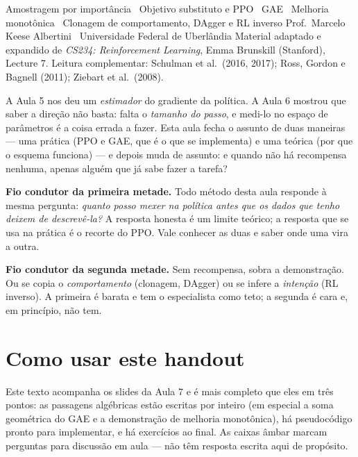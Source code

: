 \documentclass[11pt]{article}
\begin{document}
     {Amostragem por importância \textbullet\ Objetivo substituto e PPO \textbullet\ GAE \textbullet\
      Melhoria monotônica \textbullet\ Clonagem de comportamento, DAgger e RL inverso}
     {Prof.\ Marcelo Keese Albertini \textbullet\ Universidade Federal de Uberlândia}
     {Material adaptado e expandido de \textit{CS234: Reinforcement Learning}, Emma Brunskill
      (Stanford), Lecture 7. Leitura complementar: Schulman et al.\ (2016, 2017);
      Ross, Gordon e Bagnell (2011); Ziebart et al.\ (2008).}

\noindent
A Aula 5 nos deu um \emph{estimador} do gradiente da política. A Aula 6 mostrou que
saber a direção não basta: falta o \emph{tamanho do passo}, e medi-lo no espaço de
parâmetros é a coisa errada a fazer. Esta aula fecha o assunto de duas maneiras --- uma
prática (PPO e GAE, que é o que se implementa) e uma teórica (por que o esquema funciona)
--- e depois muda de assunto: e quando não há recompensa nenhuma, apenas alguém que já
sabe fazer a tarefa?

\begin{ideiabox}
  \textbf{Fio condutor da primeira metade.} Todo método desta aula responde à mesma
  pergunta: \emph{quanto posso mexer na política antes que os dados que tenho deixem de
  descrevê-la?} A resposta honesta é um limite teórico; a resposta que se usa na prática
  é o recorte do PPO. Vale conhecer as duas e saber onde uma vira a outra.

  \smallskip
  \textbf{Fio condutor da segunda metade.} Sem recompensa, sobra a demonstração. Ou se
  copia o \emph{comportamento} (clonagem, DAgger) ou se infere a \emph{intenção}
  (RL inverso). A primeira é barata e tem o especialista como teto; a segunda é cara e,
  em princípio, não tem.
\end{ideiabox}

\section*{Como usar este handout}

Este texto acompanha os slides da Aula 7 e é mais completo que eles em três pontos: as
passagens algébricas estão escritas por inteiro (em especial a soma geométrica do GAE e
a demonstração de melhoria monotônica), há pseudocódigo pronto para implementar, e há
exercícios ao final. As caixas \textcolor{rlAmbar}{âmbar} marcam perguntas para discussão
em aula --- não têm resposta escrita aqui de propósito.
\end{document}
